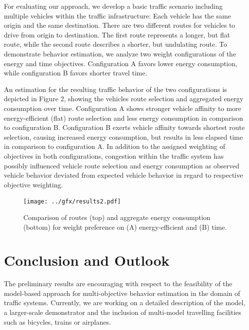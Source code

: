 \documentclass[conference]{../cls/IEEEtran}
\begin{document}
For evaluating our approach, we develop a basic traffic scenario
including multiple vehicles within the traffic infrastructure: Each vehicle has
the same origin and the same destination. There are two different
routes for vehicles to drive from origin to destination. The first route
represents a longer, but flat route, while the second route describes a shorter,
but undulating route. To demonstrate behavior estimation, we analyze two weight
configurations of the energy and time objectives. Configuration A favors lower
energy consumption, while configuration B favors shorter travel time.

An estimation for the resulting traffic behavior of the two
configurations is depicted in Figure 2, showing the vehicles route selection
and aggregated energy consumption over time. Configuration A shows
stronger vehicle affinity to more energy-efficient (flat) route selection and
less energy consumption in comparison to configuration B. Configuration B exerts
vehicle affinity towards shortest route selection, causing increased energy
consumption, but results in less elapsed time in comparison to configuration A.
In addition to the assigned weighting of objectives in both configurations,
congestion within the traffic system has possibly influenced vehicle
route selection and energy consumption as observed vehicle behavior deviated
from expected vehicle behavior in regard to respective objective weighting.

\begin{figure}[t!]
	\texttt{[image: ../gfx/results2.pdf]}
	\caption{Comparison of routes (top) and aggregate energy consumption
	(bottom) for weight preference  on (A) energy-efficient and (B) time.}
	\label{figure:results}
\end{figure}


\section{Conclusion and Outlook}

The preliminary results are encouraging with respect to the feasibility of the model-based approach for multi-objective behavior estimation in the domain of traffic systems.
Currently, we are working on a detailed description of the model, a larger-scale demonstrator and the inclusion of multi-model travelling facilities such as bicycles, trains or airplanes.



\end{document}
